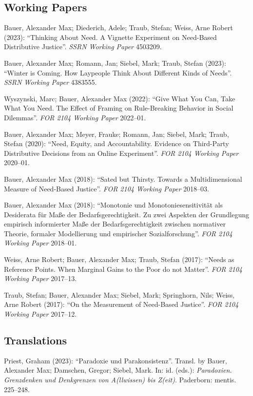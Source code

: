 \documentclass[a4paper,10pt]{article}
\newenvironment{literature}{%
   \parskip6pt\parindent0pt\raggedright
   \def\lititem{\hangindent=1cm\hangafter1}}{%
   \par\ignorespaces}
\begin{document}
\subsection*{Working Papers}
\begin{literature}
\lititem Bauer, Alexander Max; Diederich, Adele; Traub, Stefan; Weiss, Arne Robert (2023): \enquote{Thinking About Need. A Vignette Experiment on Need-Based Distributive Justice}. \textit{SSRN Working Paper} 4503209.

\lititem Bauer, Alexander Max; Romann, Jan; Siebel, Mark; Traub, Stefan (2023): \enquote{Winter is Coming. How Laypeople Think About Different Kinds of Needs}. \textit{SSRN Working Paper} 4383555.

\lititem Wyszynski, Marc; Bauer, Alexander Max (2022): \enquote{Give What You Can, Take What You Need. The Effect of Framing on Rule-Breaking Behavior in Social Dilemmas}. \textit{FOR 2104 Working Paper} 2022--01.

\lititem Bauer, Alexander Max; Meyer, Frauke; Romann, Jan; Siebel, Mark; Traub, Stefan (2020): \enquote{Need, Equity, and Accountability. Evidence on Third-Party Distributive Decisions from an Online Experiment}. \textit{FOR 2104 Working Paper} 2020--01.

\lititem Bauer, Alexander Max (2018): \enquote{Sated but Thirsty. Towards a Multidimensional Measure of Need-Based Justice}. \textit{FOR 2104 Working Paper} 2018--03.

\lititem Bauer, Alexander Max (2018): \enquote{Monotonie und Monotoniesensitivität als Desiderata für Maße der Bedarfsgerechtigkeit. Zu zwei Aspekten der Grundlegung empirisch informierter Maße der Bedarfsgerechtigkeit zwischen normativer Theorie, formaler Modellierung und empirischer Sozialforschung}. \textit{FOR 2104 Working Paper} 2018--01.

\lititem Weiss, Arne Robert; Bauer, Alexander Max; Traub, Stefan (2017): \enquote{Needs as Reference Points. When Marginal Gains to the Poor do not Matter}. \textit{FOR 2104 Working Paper} 2017--13.

\lititem Traub, Stefan; Bauer, Alexander Max; Siebel, Mark; Springhorn, Nils; Weiss, Arne Robert (2017): \enquote{On the Measurement of Need-Based Justice}. \textit{FOR 2104 Working Paper} 2017--12.
\end{literature}

\subsection*{Translations}
\begin{literature}
\lititem Priest, Graham (2023): \enquote{Paradoxie und Parakonsistenz}. Transl. by Bauer, Alexander Max; Damschen, Gregor; Siebel, Mark. In: id. (eds.): \textit{Paradoxien. Grenzdenken und Denkgrenzen von A(llwissen) bis Z(eit)}. Paderborn: mentis. 225--248.
\end{literature}
\end{document}
